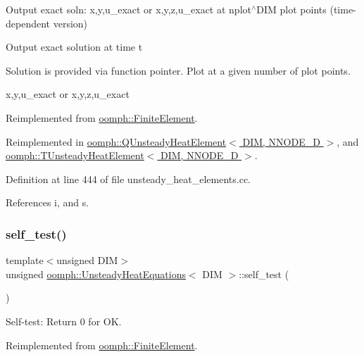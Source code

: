 Output exact soln\+: x,y,u\+\_\+exact or x,y,z,u\+\_\+exact at nplot$^\wedge$\+D\+IM plot points (time-\/dependent version) 

Output exact solution at time t

Solution is provided via function pointer. Plot at a given number of plot points.

x,y,u\+\_\+exact or x,y,z,u\+\_\+exact 

Reimplemented from \hyperlink{classoomph_1_1FiniteElement_a2a8426dccd57b927be0ae0eec00d0479}{oomph\+::\+Finite\+Element}.



Reimplemented in \hyperlink{classoomph_1_1QUnsteadyHeatElement_acf12936a99c1b43eb9459035e0c2648d}{oomph\+::\+Q\+Unsteady\+Heat\+Element$<$ D\+I\+M, N\+N\+O\+D\+E\+\_\+D $>$}, and \hyperlink{classoomph_1_1TUnsteadyHeatElement_af550a3be2cd261c495ee0c97a3ca29a7}{oomph\+::\+T\+Unsteady\+Heat\+Element$<$ D\+I\+M, N\+N\+O\+D\+E\+\_\+D $>$}.



Definition at line 444 of file unsteady\+\_\+heat\+\_\+elements.\+cc.



References i, and s.

\mbox{\label{classoomph_1_1UnsteadyHeatEquations_a6f16f48984d7edf9e67818d9e4bbcf13}} 
\subsubsection{\texorpdfstring{self\+\_\+test()}{self\_test()}}
{\footnotesize\ttfamily template$<$unsigned D\+IM$>$ \\
unsigned \hyperlink{classoomph_1_1UnsteadyHeatEquations}{oomph\+::\+Unsteady\+Heat\+Equations}$<$ D\+IM $>$\+::self\+\_\+test (\begin{DoxyParamCaption}{ }\end{DoxyParamCaption})\hspace{0.3cm}{\ttfamily [virtual]}}



Self-\/test\+: Return 0 for OK. 



Reimplemented from \hyperlink{classoomph_1_1FiniteElement_af94c5a5e22175d5420b33b3b79e46ed3}{oomph\+::\+Finite\+Element}.



